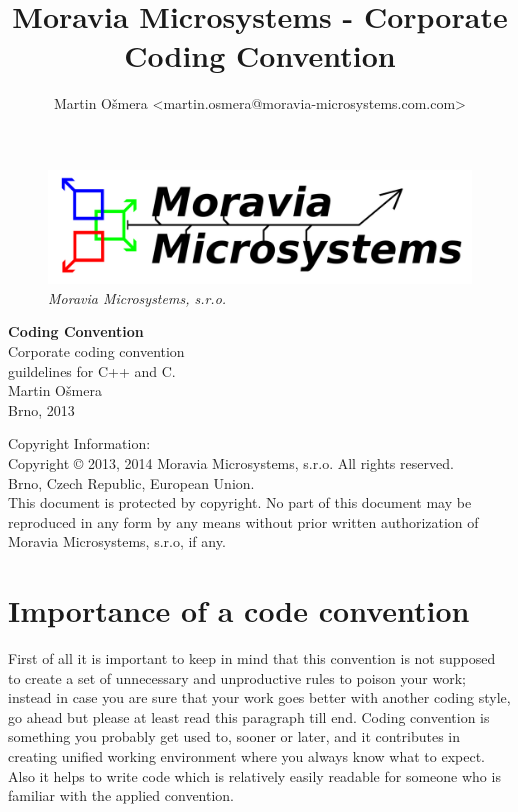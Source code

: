 \documentclass[a4paper,twoside,15pt]{book}
\title{Moravia Microsystems - Corporate Coding Convention}
\author{Martin Ošmera <martin.osmera@moravia-microsystems.com.com>}
\begin{document}
\begin{titlepage}
    \begin{figure}[ht!]
        \centering{}
        \includegraphics[width=.9\textwidth]{Moravia_Microsystems.png}
        \caption{\textit{Moravia Microsystems, s.r.o.}}
    \end{figure}
    \begin{center}
        \fontsize{35.83pt}{60pt} \selectfont{}
        \textbf{Coding Convention}
        \\[2cm]
        \fontsize{25pt}{30pt} \selectfont{}
        Corporate coding convention\\
        guildelines for C++ and C.
        \\[1cm]
        \fontsize{15pt}{19pt} \selectfont{}
        Martin Ošmera\\
        Brno, 2013
    \end{center}
\end{titlepage}

Copyright Information:
\\
Copyright \copyright{} 2013, 2014 Moravia Microsystems, s.r.o. All rights reserved.\\
Brno, Czech Republic, European Union.
\\
This document is protected by copyright. No part of this document may be reproduced in any form by any means
without prior written authorization of Moravia Microsystems, s.r.o, if any.

\tableofcontents

\chapter{Importance of a code convention}
    First of all it is important to keep in mind that this convention is not supposed to create a set of unnecessary and unproductive rules to poison your work; instead in case you are sure that your work goes better with another coding style, go ahead but please at least read this paragraph till end. Coding convention is something you probably get used to, sooner or later, and it contributes in creating unified working environment where you always know what to expect. Also it helps to write code which is relatively easily readable for someone who is familiar with the applied convention.
\end{document}
